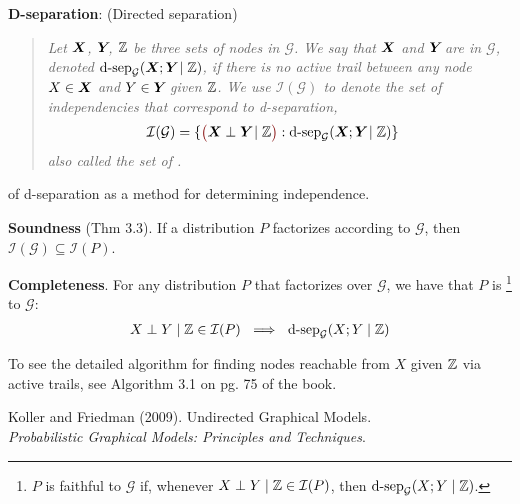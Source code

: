 \documentclass[11pt]{article}
\begin{document}
\newcommand{\dsep}{\text{d-sep}_{\mathcal G}}
\p \textbf{D-separation}: (Directed separation)
\vspace{-0.5em}
\begin{quote}
	{\itshape Let $\bm{X}_{}$, $\bm{Y}_{}$, $\mathbb{Z}$ be three sets of nodes in $\mathcal G$. We say that $\bm{X}_{}$ and $\bm{Y}_{}$ are  in $\mathcal G$, denoted $\dsep(\X; \Y \mid \Z)$, if there is no active trail between any node $X \in \bm{X}_{}$ and $Y \in \bm{Y}_{}$ given $\mathbb{Z}$. We use $\mathcal{I}(\mathcal G)$ to denote the set of independencies that correspond to d-separation,
		\begin{align}
			\mathcal{I}(\mathcal G) &= \{ \mred{\big(}  \X \perp \Y \mid \Z \mred{\big)}  : \dsep(\X ; \Y \mid \Z) \}
		\end{align}
		also called the set of .
	}
\end{quote}

\myspace
\p {} of d-separation as a method for determining independence. 
\begin{compactitem}
	\item \textbf{Soundness} (Thm 3.3). If a distribution $P$ factorizes according to $\mathcal G$, then $\mathcal I(\mathcal G) \subseteq \mathcal I(P)$. 
	
	\item \textbf{Completeness}. For any distribution $P$ that factorizes over $\mathcal G$, we have that $P$ is \footnote{$P$ is faithful to $\mathcal G$ if, whenever $X \perp Y \mid \mathbb{Z} \in \mathcal{I}(P)$, then $\dsep(X; Y \mid \Z)$.} to $\mathcal G$: 
	\begin{align}
		X \perp Y \mid \Z \in \mathcal{I}(P) ~ \implies ~ \dsep(X; Y \mid \Z)
	\end{align}
\end{compactitem}
To see the detailed algorithm for finding nodes reachable from $X$ given $\mathbb{Z}$ via active trails, see Algorithm 3.1 on pg. 75 of the book.






\vspace{-1.7em}
{\scriptsize Koller and Friedman (2009). Undirected Graphical Models.\\ \textit{Probabilistic Graphical Models: Principles and Techniques}.\\ }
\end{document}
